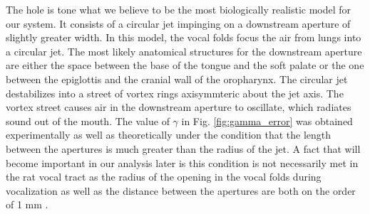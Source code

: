 \documentclass[superscriptaddress, twocolumn, prl]{revtex4}
\begin{document}
The hole is tone what we believe to be the most biologically realistic model for our system. It consists of a circular jet impinging on a downstream aperture of slightly greater width. In this model, the vocal folds focus the air from lungs into a circular jet. The most likely anatomical structures for the downstream aperture are either the space between the base of the tongue and the soft palate or the one between the epiglottis and the cranial wall of the oropharynx. The circular jet destabilizes into a street of vortex rings axisymmteric about the jet axis. The vortex street causes air in the downstream aperture to oscillate, which radiates sound out of the mouth. The value of $\gamma$ in Fig. \ref{fig:gamma_error} was obtained experimentally as well as theoretically under the condition that the length between the apertures is much greater than the radius of the jet. A fact that will become important in our analysis later is this condition is not necessarily met in the rat vocal tract as the radius of the opening in the vocal folds during vocalization as well as the distance between the apertures are both on the order of 1 mm \cite{Brudzynski2010,Chanaud1965,Howe2008}.
\end{document}
